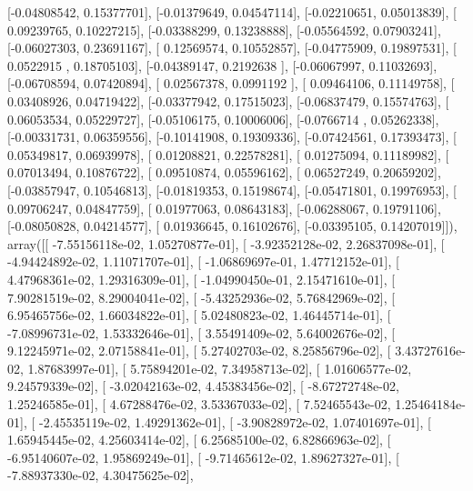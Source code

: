 \documentclass{article}
\begin{document}
       [-0.04808542,  0.15377701],
       [-0.01379649,  0.04547114],
       [-0.02210651,  0.05013839],
       [ 0.09239765,  0.10227215],
       [-0.03388299,  0.13238888],
       [-0.05564592,  0.07903241],
       [-0.06027303,  0.23691167],
       [ 0.12569574,  0.10552857],
       [-0.04775909,  0.19897531],
       [ 0.0522915 ,  0.18705103],
       [-0.04389147,  0.2192638 ],
       [-0.06067997,  0.11032693],
       [-0.06708594,  0.07420894],
       [ 0.02567378,  0.0991192 ],
       [ 0.09464106,  0.11149758],
       [ 0.03408926,  0.04719422],
       [-0.03377942,  0.17515023],
       [-0.06837479,  0.15574763],
       [ 0.06053534,  0.05229727],
       [-0.05106175,  0.10006006],
       [-0.0766714 ,  0.05262338],
       [-0.00331731,  0.06359556],
       [-0.10141908,  0.19309336],
       [-0.07424561,  0.17393473],
       [ 0.05349817,  0.06939978],
       [ 0.01208821,  0.22578281],
       [ 0.01275094,  0.11189982],
       [ 0.07013494,  0.10876722],
       [ 0.09510874,  0.05596162],
       [ 0.06527249,  0.20659202],
       [-0.03857947,  0.10546813],
       [-0.01819353,  0.15198674],
       [-0.05471801,  0.19976953],
       [ 0.09706247,  0.04847759],
       [ 0.01977063,  0.08643183],
       [-0.06288067,  0.19791106],
       [-0.08050828,  0.04214577],
       [ 0.01936645,  0.16102676],
       [-0.03395105,  0.14207019]]), array([[ -7.55156118e-02,   1.05270877e-01],
       [ -3.92352128e-02,   2.26837098e-01],
       [ -4.94424892e-02,   1.11071707e-01],
       [ -1.06869697e-01,   1.47712152e-01],
       [  4.47968361e-02,   1.29316309e-01],
       [ -1.04990450e-01,   2.15471610e-01],
       [  7.90281519e-02,   8.29004041e-02],
       [ -5.43252936e-02,   5.76842969e-02],
       [  6.95465756e-02,   1.66034822e-01],
       [  5.02480823e-02,   1.46445714e-01],
       [ -7.08996731e-02,   1.53332646e-01],
       [  3.55491409e-02,   5.64002676e-02],
       [  9.12245971e-02,   2.07158841e-01],
       [  5.27402703e-02,   8.25856796e-02],
       [  3.43727616e-02,   1.87683997e-01],
       [  5.75894201e-02,   7.34958713e-02],
       [  1.01606577e-02,   9.24579339e-02],
       [ -3.02042163e-02,   4.45383456e-02],
       [ -8.67272748e-02,   1.25246585e-01],
       [  4.67288476e-02,   3.53367033e-02],
       [  7.52465543e-02,   1.25464184e-01],
       [ -2.45535119e-02,   1.49291362e-01],
       [ -3.90828972e-02,   1.07401697e-01],
       [  1.65945445e-02,   4.25603414e-02],
       [  6.25685100e-02,   6.82866963e-02],
       [ -6.95140607e-02,   1.95869249e-01],
       [ -9.71465612e-02,   1.89627327e-01],
       [ -7.88937330e-02,   4.30475625e-02],
\end{document}
